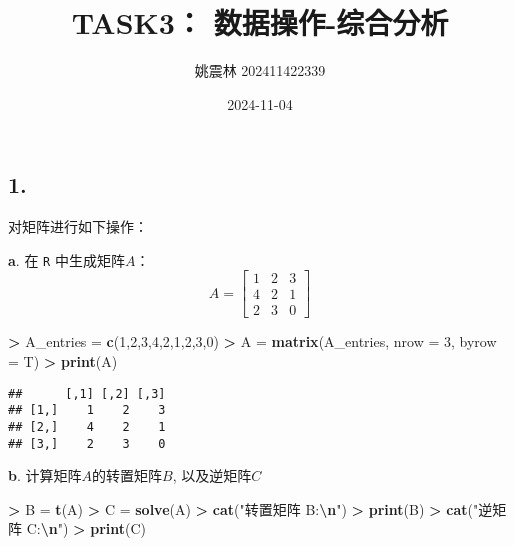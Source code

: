 \documentclass[
]{article}
\title{TASK3： 数据操作-综合分析}
\author{姚震林 202411422339}
\date{2024-11-04}
\newenvironment{Shaded}{\begin{snugshade}}{\end{snugshade}}
\newcommand{\AttributeTok}[1]{\textcolor[rgb]{0.13,0.29,0.53}{#1}}
\newcommand{\DecValTok}[1]{\textcolor[rgb]{0.00,0.00,0.81}{#1}}
\newcommand{\FunctionTok}[1]{\textcolor[rgb]{0.13,0.29,0.53}{\textbf{#1}}}
\newcommand{\NormalTok}[1]{#1}
\newcommand{\OtherTok}[1]{\textcolor[rgb]{0.56,0.35,0.01}{#1}}
\newcommand{\SpecialCharTok}[1]{\textcolor[rgb]{0.81,0.36,0.00}{\textbf{#1}}}
\newcommand{\StringTok}[1]{\textcolor[rgb]{0.31,0.60,0.02}{#1}}
\begin{document}
\maketitle

\subsection{1.}\label{section}

对矩阵进行如下操作：

\textbf{a}. 在 \texttt{R} 中生成矩阵\(A\)： \[A = \begin{bmatrix}
1 & 2 & 3 \\
4 & 2 & 1 \\
2 & 3 & 0
\end{bmatrix}\]

\begin{Shaded}
\begin{Highlighting}[]
\SpecialCharTok{\textgreater{}}\NormalTok{ A\_entries }\OtherTok{=} \FunctionTok{c}\NormalTok{(}\DecValTok{1}\NormalTok{,}\DecValTok{2}\NormalTok{,}\DecValTok{3}\NormalTok{,}\DecValTok{4}\NormalTok{,}\DecValTok{2}\NormalTok{,}\DecValTok{1}\NormalTok{,}\DecValTok{2}\NormalTok{,}\DecValTok{3}\NormalTok{,}\DecValTok{0}\NormalTok{)}
\SpecialCharTok{\textgreater{}}\NormalTok{ A }\OtherTok{=} \FunctionTok{matrix}\NormalTok{(A\_entries, }\AttributeTok{nrow =} \DecValTok{3}\NormalTok{, }\AttributeTok{byrow =}\NormalTok{ T)}
\SpecialCharTok{\textgreater{}} \FunctionTok{print}\NormalTok{(A)}
\end{Highlighting}
\end{Shaded}

\begin{verbatim}
##      [,1] [,2] [,3]
## [1,]    1    2    3
## [2,]    4    2    1
## [3,]    2    3    0
\end{verbatim}

\textbf{b}. 计算矩阵\(A\)的转置矩阵\(B\), 以及逆矩阵\(C\)

\begin{Shaded}
\begin{Highlighting}[]
\SpecialCharTok{\textgreater{}}\NormalTok{ B }\OtherTok{=} \FunctionTok{t}\NormalTok{(A)}
\SpecialCharTok{\textgreater{}}\NormalTok{ C }\OtherTok{=} \FunctionTok{solve}\NormalTok{(A)}
\SpecialCharTok{\textgreater{}} \FunctionTok{cat}\NormalTok{(}\StringTok{"转置矩阵 B:}\SpecialCharTok{\textbackslash{}n}\StringTok{"}\NormalTok{)}
\SpecialCharTok{\textgreater{}} \FunctionTok{print}\NormalTok{(B)}
\SpecialCharTok{\textgreater{}} \FunctionTok{cat}\NormalTok{(}\StringTok{"逆矩阵 C:}\SpecialCharTok{\textbackslash{}n}\StringTok{"}\NormalTok{)}
\SpecialCharTok{\textgreater{}} \FunctionTok{print}\NormalTok{(C)}
\end{Highlighting}
\end{Shaded}
\end{document}
